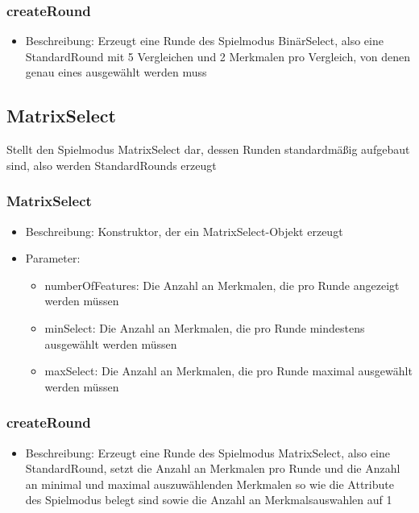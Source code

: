 \documentclass[a4paper]{scrreprt}
\begin{document}
	\subsubsection{createRound}
	\begin{itemize}
		\item Beschreibung: Erzeugt eine Runde des Spielmodus BinärSelect, also eine StandardRound mit 5 Vergleichen und 2 Merkmalen pro Vergleich, von denen genau eines ausgewählt werden muss
	\end{itemize}

	\subsection{MatrixSelect}
	Stellt den Spielmodus MatrixSelect dar, dessen Runden standardmäßig aufgebaut sind, also werden StandardRounds erzeugt
	\subsubsection{MatrixSelect}
		\begin{itemize}
		\item Beschreibung: Konstruktor, der ein MatrixSelect-Objekt erzeugt
		\item Parameter:
		\begin{itemize}
		\item numberOfFeatures: Die Anzahl an Merkmalen, die pro Runde angezeigt werden müssen
		\item minSelect: Die Anzahl an Merkmalen, die pro Runde mindestens ausgewählt werden müssen
		\item maxSelect: Die Anzahl an Merkmalen, die pro Runde maximal ausgewählt werden müssen
		\end{itemize}
		\end{itemize}
	\subsubsection{createRound}
	\begin{itemize}
		\item Beschreibung: Erzeugt eine Runde des Spielmodus MatrixSelect, also eine StandardRound, setzt die Anzahl an Merkmalen pro Runde und die Anzahl an minimal und maximal auszuwählenden Merkmalen so wie die Attribute des Spielmodus belegt sind sowie die Anzahl an Merkmalsauswahlen auf 1
	\end{itemize}
\end{document}
